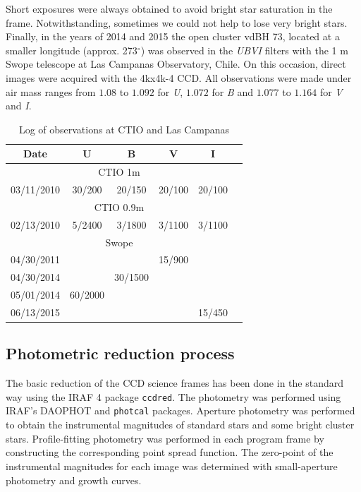 \documentclass[draft]{aa}
\begin{document}
Short exposures were always obtained to avoid bright star saturation in the
frame. Notwithstanding, sometimes we could not help to lose very bright stars.
Finally, in the years of 2014 and 2015 the open cluster vdBH 73,
located at a smaller longitude (approx. 273$^\circ$) was observed in the 
\textit{UBVI} filters with the 1 m Swope telescope at Las Campanas Observatory,
Chile. On this occasion, direct images were acquired with the 4kx4k-4 CCD. All
observations were made under air mass ranges from $1.08$ to $1.092$ for 
\textit{U}, $1.072$ for \textit{B} and $1.077$ to $1.164$ for \textit{V} and 
\textit{I}.

\begin{table}[ht]
    \centering
    \begin{tabular}{cccccc}
    \hline
         Date & U & B & V & I  \\
         \hline \hline
         \multicolumn{5}{c}{CTIO 1m}\\
         \hline
         03/11/2010 & 30/200 & 20/150 & 20/100 & 20/100\\
         \multicolumn{5}{c}{CTIO 0.9m}\\
         \hline
         02/13/2010 & 5/2400 & 3/1800 & 3/1100 & 3/1100\\
         \multicolumn{5}{c}{Swope}\\
         \hline
         04/30/2011 & & & 15/900 & \\
         04/30/2014 & & 30/1500 & & \\
         05/01/2014 & 60/2000 & & & \\
         06/13/2015 & & & & 15/450 \\
         \hline
    \end{tabular}
    \caption{Log of observations at CTIO and Las Campanas}
    \label{tab:log_ctio}
\end{table}




\subsection{Photometric reduction process}

The basic reduction of the CCD science frames has been done in the standard way
using the IRAF 4 package \texttt{ccdred}. The photometry was performed using
IRAF's DAOPHOT \citep{Stetson_1987,Stetson_1990} and \texttt{photcal} packages.
Aperture photometry was performed to obtain the instrumental magnitudes of
standard stars and some bright cluster stars. Profile-fitting photometry was
performed in each program frame by constructing the corresponding point spread
function. The zero-point of the instrumental magnitudes for each image was
determined with small-aperture photometry and growth curves.
\end{document}
